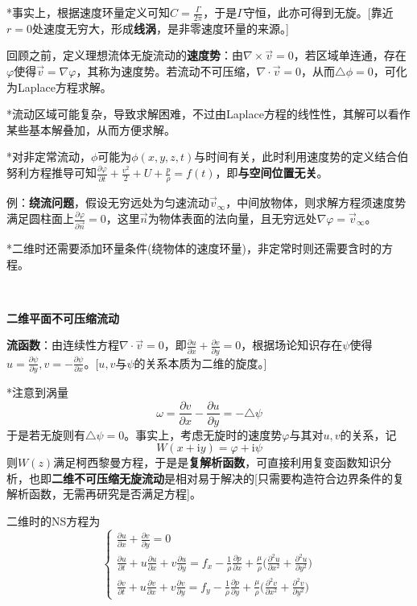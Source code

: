 \documentclass[a4paper,UTF8,fontset=windows]{ctexart}
\begin{document}
*事实上，根据速度环量定义可知$C=\frac{\Gamma}{2\pi}$，于是$\Gamma$守恒，此亦可得到无旋。[靠近$r=0$处速度无穷大，形成\textbf{线涡}，是非零速度环量的来源。]

回顾之前，定义理想流体无旋流动的\textbf{速度势}：由$\nabla\times\vec{v}=0$，若区域单连通，存在$\varphi$使得$\vec{v}=\nabla\varphi$，其称为速度势。若流动不可压缩，$\nabla\cdot\vec{v}=0$，从而$\triangle\phi=0$，可化为Laplace方程求解。

*流动区域可能复杂，导致求解困难，不过由Laplace方程的线性性，其解可以看作某些基本解叠加，从而方便求解。

*对非定常流动，$\phi$可能为$\phi(x,y,z,t)$与时间有关，此时利用速度势的定义结合伯努利方程推导可知$\frac{\partial\varphi}{\partial t}+\frac{v^2}{2}+U+\frac{p}{\rho}=f(t)$，即\textbf{与空间位置无关}。

例：\textbf{绕流问题}，假设无穷远处为匀速流动$\vec{v}_\infty$，中间放物体，则求解方程须速度势满足圆柱面上$\frac{\partial\varphi}{\partial\vec{n}}=0$，这里$\vec{n}$为物体表面的法向量，且无穷远处$\nabla\varphi=\vec{v}_\infty$。

*二维时还需要添加环量条件(绕物体的速度环量)，非定常时则还需要含时的方程。

\

\textbf{二维平面不可压缩流动}

\textbf{流函数}：由连续性方程$\nabla\cdot\vec{v}=0$，即$\frac{\partial u}{\partial x}+\frac{\partial v}{\partial y}=0$，根据场论知识存在$\psi$使得$u=\frac{\partial\psi}{\partial y},v=-\frac{\partial\psi}{\partial x}$。[$u,v$与$\psi$的关系本质为二维的旋度。]

*注意到涡量
$$\omega=\frac{\partial v}{\partial x}-\frac{\partial u}{\partial y}=-\triangle\psi$$
于是若无旋则有$\triangle\psi=0$。事实上，考虑无旋时的速度势$\varphi$与其对$u,v$的关系，记
$$W(x+\mathrm{i}y)=\varphi+\mathrm{i}\psi$$
则$W(z)$满足柯西黎曼方程，于是是\textbf{复解析函数}，可直接利用复变函数知识分析，也即\textbf{二维不可压缩无旋流动}是相对易于解决的[只需要构造符合边界条件的复解析函数，无需再研究是否满足方程]。

二维时的NS方程为
$$\begin{cases}\frac{\partial u}{\partial x}+\frac{\partial v}{\partial y}=0\\\frac{\partial u}{\partial t}+u\frac{\partial u}{\partial x}+v\frac{\partial u}{\partial y}=f_x-\frac{1}{\rho}\frac{\partial p}{\partial x}+\frac{\mu}{\rho}\big(\frac{\partial^2u}{\partial x^2}+\frac{\partial^2u}{\partial y^2}\big)\\\frac{\partial v}{\partial t}+u\frac{\partial v}{\partial x}+v\frac{\partial v}{\partial y}=f_y-\frac{1}{\rho}\frac{\partial p}{\partial y}+\frac{\mu}{\rho}\big(\frac{\partial^2v}{\partial x^2}+\frac{\partial^2v}{\partial y^2}\big)\end{cases}$$
\end{document}
